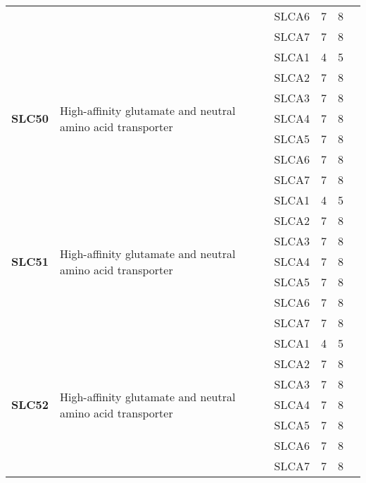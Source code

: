 \documentclass[12pt]{report}
\begin{document}
\begin{center}
\begin{longtable}{|p{1.5cm}|p{3.2cm}|p{1.9cm}|p{1.65cm}|p{3cm}|p{3cm}|}
\cline{3-6}
&&SLCA6&7 & 8&\\ 
\cline{3-6}
&&SLCA7&7 & 8&\\ 
\hline
\multirow{7}{1.5cm}{\textbf{SLC50}} & \multirow{7}{4cm}{High-affinity glutamate and neutral amino acid transporter} & SLCA1 & 4 & 5\\ 
\cline{3-6}
&&SLCA2&7 & 8&\\ 
\cline{3-6}
&&SLCA3&7 & 8&\\ 
\cline{3-6}
&&SLCA4&7 & 8&\\ 
\cline{3-6}
&&SLCA5&7 & 8&\\ 
\cline{3-6}
&&SLCA6&7 & 8&\\ 
\cline{3-6}
&&SLCA7&7 & 8&\\ 
\hline
\multirow{7}{1.5cm}{\textbf{SLC51}} & \multirow{7}{4cm}{High-affinity glutamate and neutral amino acid transporter} & SLCA1 & 4 & 5\\ 
\cline{3-6}
&&SLCA2&7 & 8&\\ 
\cline{3-6}
&&SLCA3&7 & 8&\\ 
\cline{3-6}
&&SLCA4&7 & 8&\\ 
\cline{3-6}
&&SLCA5&7 & 8&\\ 
\cline{3-6}
&&SLCA6&7 & 8&\\ 
\cline{3-6}
&&SLCA7&7 & 8&\\ 
\hline
\multirow{7}{1.5cm}{\textbf{SLC52}} & \multirow{7}{4cm}{High-affinity glutamate and neutral amino acid transporter} & SLCA1 & 4 & 5\\ 
\cline{3-6}
&&SLCA2&7 & 8&\\ 
\cline{3-6}
&&SLCA3&7 & 8&\\ 
\cline{3-6}
&&SLCA4&7 & 8&\\ 
\cline{3-6}
&&SLCA5&7 & 8&\\ 
\cline{3-6}
&&SLCA6&7 & 8&\\ 
\cline{3-6}
&&SLCA7&7 & 8&\\ 
\hline

\end{longtable}
\end{center}
\end{document}
